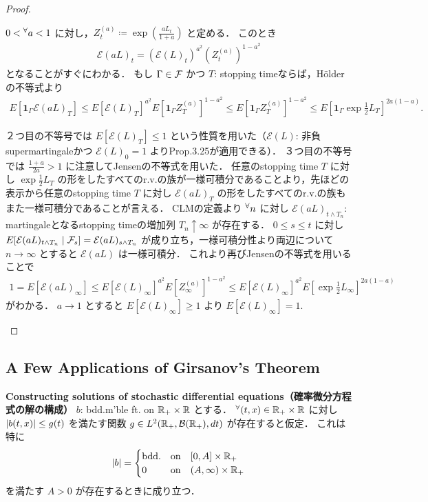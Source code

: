 \documentclass{jsarticle}
\begin{document}
\begin{proof}
\begin{description}
        $0<{}^{\forall} a<1$ に対し，$Z_t^{(a)}\coloneqq\exp(\frac{aL_t}{1+a})$ と定める．
        このとき
        \begin{align}
            \mathcal{E}(aL)_t
            = (\mathcal{E}(L)_t)^{a^2}(Z_t^{(a)})^{1-a^2}
        \end{align}
        となることがすぐにわかる．
        もし $\Gamma\in\mathcal{F}$ かつ $T$: stopping timeならば，H\"{o}lderの不等式より
        \begin{align}
            E[\bm{1}_\Gamma\mathcal{E}(aL)_T]
            \le E[\mathcal{E}(L)_T]^{a^2}
            E[\bm{1}_\Gamma Z_T^{(a)}]^{1-a^2}
            \le E[\bm{1}_\Gamma Z_T^{(a)}]^{1-a^2}
            \le E[\bm{1}_\Gamma\exp\frac{1}{2}L_T]^{2a(1-a)}.
        \end{align}

        ２つ目の不等号では $E[\mathcal{E}(L)_T]\le1$ という性質を用いた（$\mathcal{E}(L)$: 非負supermartingaleかつ $\mathcal{E}(L)_0=1$ よりProp.3.25が適用できる）．
        ３つ目の不等号では $\frac{1+a}{2a}>1$ に注意してJensenの不等式を用いた．
        任意のstopping time $T$ に対し $\exp\frac{1}{2}L_T$ の形をしたすべてのr.v.の族が一様可積分であることより，先ほどの表示から任意のstopping time $T$ に対し $\mathcal{E}(aL)_T$ の形をしたすべてのr.v.の族もまた一様可積分であることが言える．
        CLMの定義より ${}^{\forall} n$ に対し $\mathcal{E}(aL)_{t\wedge T_n}$: martingaleとなるstopping timeの増加列 $T_n\uparrow\infty$ が存在する．
        $0\le s\le t$ に対し $E[\mathcal{E}(aL)_{t\wedge T_n}\mid\mathcal{F}_s]=\mathcal{E}(aL)_{s\wedge T_n}$ が成り立ち，一様可積分性より両辺について $n\to\infty$ とすると $\mathcal{E}(aL)$ は一様可積分．
        これより再びJensenの不等式を用いることで
        \begin{align}
            1=E[\mathcal{E}(aL)_{\infty}]
            \le E[\mathcal{E}(L)_\infty]^{a^2}
            E[Z_{\infty}^{(a)}]^{1-a^2}
            \le E[\mathcal{E}(L)_\infty]^{a^2}
            E[\exp\frac{1}{2}L_\infty]^{2a(1-a)}
        \end{align}
        がわかる．
        $a\to1$ とすると $E[\mathcal{E}(L)_\infty]\ge1$ より $E[\mathcal{E}(L)_\infty]=1.$
    \end{description}
\end{proof}


\subsection{A Few Applications of Girsanov's Theorem}

\textbf{Constructing solutions of stochastic differential equations（確率微分方程式の解の構成）}
$b$: bdd.m'ble ft. on $\mathbb{R}_+\times\mathbb{R}$ とする．
${}^{\forall} (t,x)\in\mathbb{R}_+\times\mathbb{R}$ に対し $\lvert b(t,x)\rvert\le g(t)$ を満たす関数 $g\in L^2(\mathbb{R}_+,\mathcal{B}(\mathbb{R}_+),dt)$ が存在すると仮定．
これは特に
\begin{align}
    \lvert b\rvert=
    \begin{cases}
        \text{bdd.} &\text{on}\quad [0,A]\times\mathbb{R}_+ \\
        0 &\text{on}\quad (A,\infty)\times\mathbb{R}_+
    \end{cases}
\end{align}
を満たす $A>0$ が存在するときに成り立つ．
\end{document}
